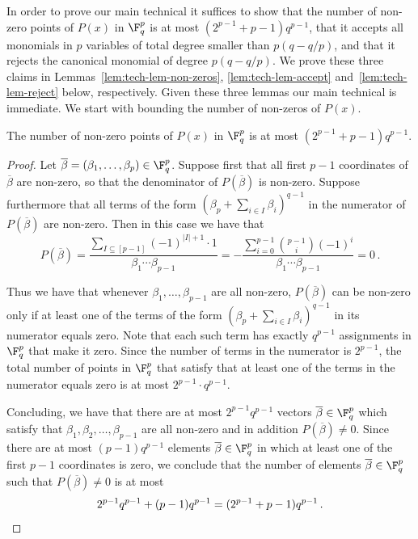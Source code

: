 In order to prove our main technical  it suffices to show that the number of non-zero points of $P(x)$ in $\F_{q}^p$ is at most
$(2^{p-1}+p-1)q^{p-1}$, that it accepts all monomials in $p$ variables of total degree smaller than $p(q-q/p)$, and that it rejects the canonical monomial of degree $
p(q-q/p)$. We prove these three claims in Lemmas~\ref{lem:tech-lem-non-zeros}, \ref{lem:tech-lem-accept} and~\ref{lem:tech-lem-reject} below, respectively. Given these three
lemmas our main technical  is immediate. We start with bounding the number of non-zeros of $P(x)$.

\begin{lemma}\label{lem:tech-lem-non-zeros}
The number of non-zero points of $P(x)$ in $\F_{q}^p$ is at most $(2^{p-1}+p-1)q^{p-1}$.
\end{lemma}

\begin{proof}
Let $\overline \beta= (\beta_1,\ldots,\beta_p) \in \F_q^p$. Suppose first that all first $p-1$ coordinates of $\overline \beta$ are non-zero, so that the denominator of $P(\overline \beta)$ is non-zero. Suppose furthermore that all terms of the form $(\beta_p + \sum_{i \in I} \beta_i)^{q-1}$ in the numerator of $P(\overline \beta)$ are non-zero. Then in this case we have that
\[P(\overline \beta) = \frac {\sum_{ I \subseteq [p-1]} (-1)^{|I|+1} \cdot 1 } {\beta_1 \cdots \beta_{p-1}} =  -\frac {\sum_{i=0}^{p-1} \binom {p-1} {i} (-1)^{i} } {\beta_1 \cdots \beta_{p-1}}  = 0 \,.\]

Thus we have that whenever $\beta_1,\ldots,\beta_{p-1}$ are all non-zero, $P(\overline \beta)$ can be non-zero only if at least one of the terms of the form $(\beta_p + \sum_{i \in I} \beta_i)^{q-1}$ in its numerator equals zero. Note that each such term has exactly $q^{p-1}$ assignments in $\F_q^p$ that make it zero. Since the number of terms in the numerator is $2^{p-1}$,
the total number of points in $\F_q^p$ that satisfy that at least one of the terms in the numerator equals zero is at most
$2^{p-1}\cdot  q^{p-1}$.

Concluding, we have that there are at most $2^{p-1} q^{p-1}$ vectors $\overline \beta \in \F_q^p$ which satisfy that $\beta_1,\beta_2,\ldots,\beta_{p-1}$ are all non-zero and in addition $P(\overline \beta) \neq 0$. Since there are at most
$(p-1)q^{p-1}$ elements $\overline \beta \in \F_q^p$ in which at least one of the first $p-1$ coordinates is zero, we conclude that the number of elements $\overline \beta \in \F_q^p$ such that $P(\overline \beta) \neq 0$ is at most \[2^{p-1} q^{p-1} + (p-1)q^{p-1} =
(2^{p-1}+p-1)q^{p-1}\,.\qedhere\] 
\end{proof}

